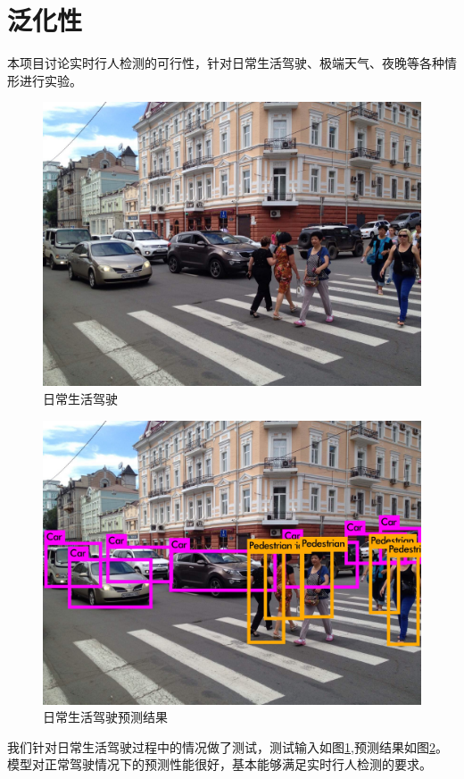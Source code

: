\section{泛化性}{
	本项目讨论实时行人检测的可行性，针对日常生活驾驶、极端天气、夜晚等各种情形进行实验。

	\begin{figure}[htbp]
	\centering
	\includegraphics[width=5in]{images/daily.jpg}
	\caption{日常生活驾驶}
	\label{daily}
	\end{figure}
	\begin{figure}[htbp]
	\centering
	\includegraphics[width=5in]{images/predictDaily.jpg}
	\caption{日常生活驾驶预测结果}
	\label{predictDaily}
	\end{figure}
	我们针对日常生活驾驶过程中的情况做了测试，测试输入如图\ref{daily},预测结果如图\ref{predictDaily}。模型对正常驾驶情况下的预测性能很好，基本能够满足实时行人检测的要求。

}
